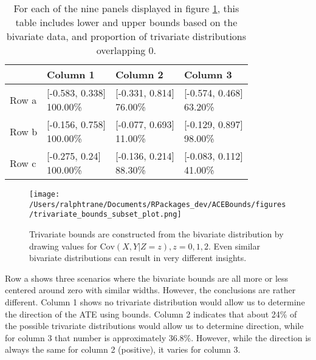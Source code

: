 \documentclass[
]{article}
\theoremstyle{plain}
\begin{document}
\begin{table}[H]
  \center
  
\begin{tabular}{l|l|l|l}
\hline
  & Column 1 & Column 2 & Column 3\\
\hline
Row a & \makecell[l]{[-0.583, 0.338]\\100.00\%} & \makecell[c]{[-0.331, 0.814]\\76.00\%} & \makecell[r]{[-0.574, 0.468]\\63.20\%}\\
\hline
Row b & \makecell[l]{[-0.156, 0.758]\\100.00\%} & \makecell[c]{[-0.077, 0.693]\\11.00\%} & \makecell[r]{[-0.129, 0.897]\\98.00\%}\\
\hline
Row c & \makecell[l]{[-0.275, 0.24]\\100.00\%} & \makecell[c]{[-0.136, 0.214]\\88.30\%} & \makecell[r]{[-0.083, 0.112]\\41.00\%}\\
\hline
\end{tabular}


  \caption{For each of the nine panels displayed in figure \ref{fig:trivariate_bounds}, this table includes lower and upper bounds based on the bivariate data, and proportion of trivariate distributions overlapping 0.}
  \label{tab:subset_plot_summaries_a}
\end{table}

\begin{figure}[H]
  \center
  \texttt{[image: /Users/ralphtrane/Documents/RPackages\_dev/ACEBounds/figures/trivariate\_bounds\_subset\_plot.png]}
  \caption{Trivariate bounds are constructed from the bivariate distribution by drawing values for $\text{Cov}(X,Y|Z=z),z=0,1,2$. Even similar bivariate distributions can result in very different insights.}
  \label{fig:trivariate_bounds}
\end{figure}

Row a shows three scenarios where the bivariate bounds are all more or less centered around zero with similar widths. However, the conclusions are rather different. Column 1 shows no trivariate distribution would allow us to determine the direction of the ATE using bounds. Column 2 indicates that about 24\% of the possible trivariate distributions would allow us to determine direction, while for column 3 that number is approximately 36.8\%. However, while the direction is always the same for column 2 (positive), it varies for column 3.
\end{document}
